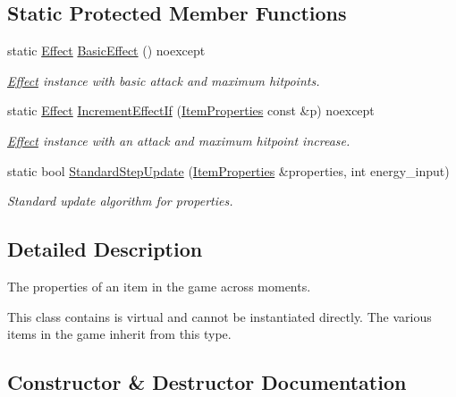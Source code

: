 \subsection*{Static Protected Member Functions}
\begin{DoxyCompactItemize}
\item 
static \hyperlink{classitem_1_1_effect}{Effect} \hyperlink{classitem_1_1_item_a69a02566ccfd21e054e48864a9d4362e}{Basic\+Effect} () noexcept
\begin{DoxyCompactList}\small\item\em {\ttfamily \hyperlink{classitem_1_1_effect}{Effect}} instance with basic attack and maximum hitpoints. \end{DoxyCompactList}\item 
static \hyperlink{classitem_1_1_effect}{Effect} \hyperlink{classitem_1_1_item_abaff3ea78fa8c9940868b99ce8b6d2ea}{Increment\+Effect\+If} (\hyperlink{classitem_1_1_item_properties}{Item\+Properties} const \&p) noexcept
\begin{DoxyCompactList}\small\item\em {\ttfamily \hyperlink{classitem_1_1_effect}{Effect}} instance with an attack and maximum hitpoint increase. \end{DoxyCompactList}\item 
static bool \hyperlink{classitem_1_1_item_a93ef8f291ecf2886ea6902d496624334}{Standard\+Step\+Update} (\hyperlink{classitem_1_1_item_properties}{Item\+Properties} \&properties, int energy\+\_\+input)
\begin{DoxyCompactList}\small\item\em Standard update algorithm for properties. \end{DoxyCompactList}\end{DoxyCompactItemize}


\subsection{Detailed Description}
The properties of an item in the game across moments. 

This class contains is virtual and cannot be instantiated directly. The various items in the game inherit from this type. 

\subsection{Constructor \& Destructor Documentation}
\mbox{\label{classitem_1_1_item_aebe9569e9074ee805b6213f500066115}} 
